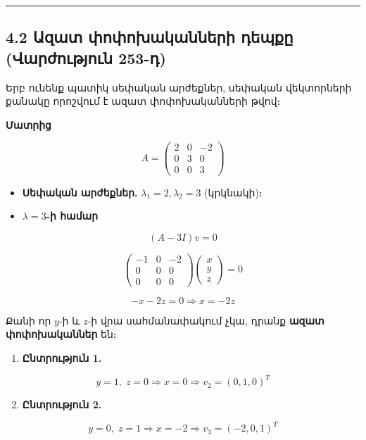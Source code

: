 \documentclass[12pt, a4paper]{article}
\begin{document}
\vspace{1em}
\hrule
\vspace{1em}

\subsection{4.2 Ազատ փոփոխականների դեպքը (Վարժություն 253-դ)}

Երբ ունենք պատիկ սեփական արժեքներ, սեփական վեկտորների քանակը որոշվում է ազատ փոփոխականների թվով։

\textbf{Մատրից}

$$
A =
\begin{pmatrix}
2 & 0 & -2 \\
0 & 3 & 0 \\
0 & 0 & 3
\end{pmatrix}
$$

\begin{itemize}
    \item \textbf{Սեփական արժեքներ.} $\lambda_1 = 2, \lambda_2 = 3$ (կրկնակի)։
    \item \textbf{$\lambda = 3$-ի համար}
\end{itemize}

$$
(A - 3I)v = 0
$$

$$
\begin{pmatrix}
-1 & 0 & -2 \\
0 & 0 & 0 \\
0 & 0 & 0
\end{pmatrix}
\begin{pmatrix}
x \\
y \\
z
\end{pmatrix}
=0
$$

$$
-x - 2z = 0 \Rightarrow x = -2z
$$

Քանի որ $y$-ի և $z$-ի վրա սահմանափակում չկա, դրանք \textbf{ազատ փոփոխականներ} են։

\begin{enumerate}
    \item \textbf{Ընտրություն 1.}
\end{enumerate}

$$
y=1,\; z=0 \Rightarrow x=0 \Rightarrow v_2 = (0,1,0)^T
$$

\begin{enumerate}
    \setcounter{enumi}{1}
    \item \textbf{Ընտրություն 2.}
\end{enumerate}

$$
y=0,\; z=1 \Rightarrow x=-2 \Rightarrow v_3 = (-2,0,1)^T
$$
\end{document}
